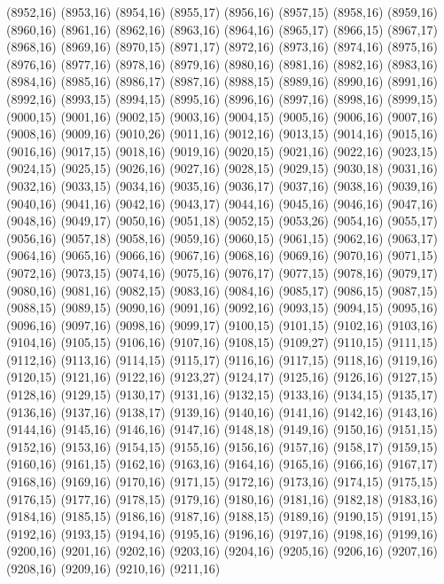 (8952,16)
(8953,16)
(8954,16)
(8955,17)
(8956,16)
(8957,15)
(8958,16)
(8959,16)
(8960,16)
(8961,16)
(8962,16)
(8963,16)
(8964,16)
(8965,17)
(8966,15)
(8967,17)
(8968,16)
(8969,16)
(8970,15)
(8971,17)
(8972,16)
(8973,16)
(8974,16)
(8975,16)
(8976,16)
(8977,16)
(8978,16)
(8979,16)
(8980,16)
(8981,16)
(8982,16)
(8983,16)
(8984,16)
(8985,16)
(8986,17)
(8987,16)
(8988,15)
(8989,16)
(8990,16)
(8991,16)
(8992,16)
(8993,15)
(8994,15)
(8995,16)
(8996,16)
(8997,16)
(8998,16)
(8999,15)
(9000,15)
(9001,16)
(9002,15)
(9003,16)
(9004,15)
(9005,16)
(9006,16)
(9007,16)
(9008,16)
(9009,16)
(9010,26)
(9011,16)
(9012,16)
(9013,15)
(9014,16)
(9015,16)
(9016,16)
(9017,15)
(9018,16)
(9019,16)
(9020,15)
(9021,16)
(9022,16)
(9023,15)
(9024,15)
(9025,15)
(9026,16)
(9027,16)
(9028,15)
(9029,15)
(9030,18)
(9031,16)
(9032,16)
(9033,15)
(9034,16)
(9035,16)
(9036,17)
(9037,16)
(9038,16)
(9039,16)
(9040,16)
(9041,16)
(9042,16)
(9043,17)
(9044,16)
(9045,16)
(9046,16)
(9047,16)
(9048,16)
(9049,17)
(9050,16)
(9051,18)
(9052,15)
(9053,26)
(9054,16)
(9055,17)
(9056,16)
(9057,18)
(9058,16)
(9059,16)
(9060,15)
(9061,15)
(9062,16)
(9063,17)
(9064,16)
(9065,16)
(9066,16)
(9067,16)
(9068,16)
(9069,16)
(9070,16)
(9071,15)
(9072,16)
(9073,15)
(9074,16)
(9075,16)
(9076,17)
(9077,15)
(9078,16)
(9079,17)
(9080,16)
(9081,16)
(9082,15)
(9083,16)
(9084,16)
(9085,17)
(9086,15)
(9087,15)
(9088,15)
(9089,15)
(9090,16)
(9091,16)
(9092,16)
(9093,15)
(9094,15)
(9095,16)
(9096,16)
(9097,16)
(9098,16)
(9099,17)
(9100,15)
(9101,15)
(9102,16)
(9103,16)
(9104,16)
(9105,15)
(9106,16)
(9107,16)
(9108,15)
(9109,27)
(9110,15)
(9111,15)
(9112,16)
(9113,16)
(9114,15)
(9115,17)
(9116,16)
(9117,15)
(9118,16)
(9119,16)
(9120,15)
(9121,16)
(9122,16)
(9123,27)
(9124,17)
(9125,16)
(9126,16)
(9127,15)
(9128,16)
(9129,15)
(9130,17)
(9131,16)
(9132,15)
(9133,16)
(9134,15)
(9135,17)
(9136,16)
(9137,16)
(9138,17)
(9139,16)
(9140,16)
(9141,16)
(9142,16)
(9143,16)
(9144,16)
(9145,16)
(9146,16)
(9147,16)
(9148,18)
(9149,16)
(9150,16)
(9151,15)
(9152,16)
(9153,16)
(9154,15)
(9155,16)
(9156,16)
(9157,16)
(9158,17)
(9159,15)
(9160,16)
(9161,15)
(9162,16)
(9163,16)
(9164,16)
(9165,16)
(9166,16)
(9167,17)
(9168,16)
(9169,16)
(9170,16)
(9171,15)
(9172,16)
(9173,16)
(9174,15)
(9175,15)
(9176,15)
(9177,16)
(9178,15)
(9179,16)
(9180,16)
(9181,16)
(9182,18)
(9183,16)
(9184,16)
(9185,15)
(9186,16)
(9187,16)
(9188,15)
(9189,16)
(9190,15)
(9191,15)
(9192,16)
(9193,15)
(9194,16)
(9195,16)
(9196,16)
(9197,16)
(9198,16)
(9199,16)
(9200,16)
(9201,16)
(9202,16)
(9203,16)
(9204,16)
(9205,16)
(9206,16)
(9207,16)
(9208,16)
(9209,16)
(9210,16)
(9211,16)
